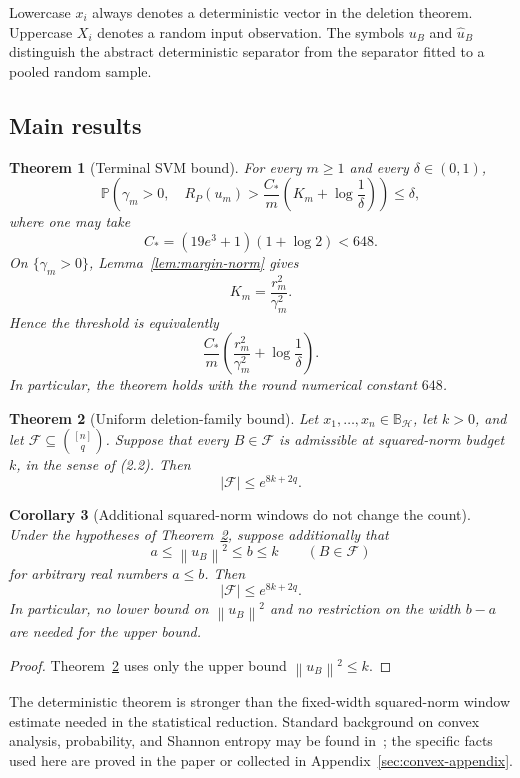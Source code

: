 \documentclass[11pt]{article}
\newtheorem{theorem}{Theorem}[section]
\newtheorem{corollary}[theorem]{Corollary}
\theoremstyle{definition}
\theoremstyle{remark}
\newcommand{\Hh}{\mathcal H}
\newcommand{\Pp}{\mathbb P}
\newcommand{\norm}[1]{\left\lVert #1\right\rVert}
\newcommand{\Risk}{R_P}
\begin{document}
Lowercase \(x_i\) always denotes a deterministic vector in the deletion
theorem. Uppercase \(X_i\) denotes a random input observation. The symbols
\(u_B\) and \(\widehat u_B\) distinguish the abstract deterministic separator
from the separator fitted to a pooled random sample.

\subsection{Main results}

\begin{theorem}[Terminal SVM bound]
\label{thm:main-svm}
For every \(m\ge1\) and every \(\delta\in(0,1)\),
\[
 \boxed{
 \Pp\left(
   \gamma_m>0,\quad
   \Risk(u_m)>
   \frac{C_*}{m}
   \left(
      K_m+\log\frac1\delta
   \right)
 \right)
 \le\delta,}
\]
where one may take
\[
 C_*=(19e^3+1)(1+\log2)<648.
\]
On \(\{\gamma_m>0\}\), Lemma~\ref{lem:margin-norm} gives
\[
 K_m=\frac{r_m^2}{\gamma_m^2}.
\]
Hence the threshold is equivalently
\[
 \frac{C_*}{m}
 \left(
   \frac{r_m^2}{\gamma_m^2}+\log\frac1\delta
 \right).
\]
In particular, the theorem holds with the round numerical constant \(648\).
\end{theorem}

\begin{theorem}[Uniform deletion-family bound]
\label{thm:uniform-count}
Let \(x_1,\ldots,x_n\in\mathbb B_{\Hh}\), let \(k>0\), and let
\(\mathcal F\subseteq\binom{[n]}q\). Suppose that every
\(B\in\mathcal F\) is admissible at squared-norm budget \(k\), in the sense
of (2.2). Then
\[
 \boxed{|\mathcal F|\le e^{8k+2q}.}
\]
\end{theorem}

\begin{corollary}[Additional squared-norm windows do not change the count]
\label{cor:finite-shell}
Under the hypotheses of Theorem~\ref{thm:uniform-count}, suppose additionally
that
\[
 a\le\norm{u_B}^2\le b\le k
 \qquad(B\in\mathcal F)
\]
for arbitrary real numbers \(a\le b\). Then
\[
 |\mathcal F|\le e^{8k+2q}.
\]
In particular, no lower bound on \(\norm{u_B}^2\) and no restriction on the
width \(b-a\) are needed for the upper bound.
\end{corollary}

\begin{proof}
Theorem~\ref{thm:uniform-count} uses only the upper bound
\(\norm{u_B}^2\le k\).
\end{proof}

The deterministic theorem is stronger than the fixed-width squared-norm
window estimate needed in the statistical reduction. Standard background on
convex analysis, probability, and Shannon entropy may be found
in~\cite{R70,B95,CT06}; the specific facts used here are proved in the paper
or collected in Appendix~\ref{sec:convex-appendix}.
\end{document}
